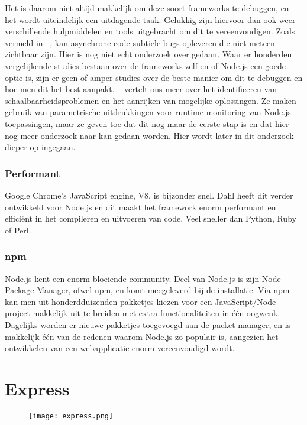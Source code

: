 Het is daarom niet altijd makkelijk om deze soort frameworks te debuggen, en het wordt uiteindelijk een uitdagende taak. Gelukkig zijn hiervoor dan ook weer verschillende hulpmiddelen en tools uitgebracht om dit te vereenvoudigen. Zoals vermeld in ~\autocite{Runtime2017}, kan asynchrone code subtiele bugs opleveren die niet meteen zichtbaar zijn. Hier is nog niet echt onderzoek over gedaan. Waar er honderden vergelijkende studies bestaan over de frameworks zelf en of Node.js een goede optie is, zijn er geen of amper studies over de beste manier om dit te debuggen en hoe men dit het best aanpakt. ~\autocite{Runtime2017} vertelt ons meer over het identificeren van schaalbaarheidsproblemen en het aanrijken van mogelijke oplossingen. Ze maken gebruik van parametrische uitdrukkingen voor runtime monitoring van Node.js toepassingen, maar ze geven toe dat dit nog maar de eerste stap is en dat hier nog meer onderzoek naar kan gedaan worden. Hier wordt later in dit onderzoek dieper op ingegaan.

\subsubsection{Performant}
\label{sec:fast}

Google Chrome's JavaScript engine, V8, is bijzonder snel. Dahl heeft dit verder ontwikkeld voor Node.js en dit maakt het framework enorm performant en efficiënt in het compileren en uitvoeren van code. Veel sneller dan Python, Ruby of Perl.

\subsubsection{npm}
\label{sec:npm}

Node.js kent een enorm bloeiende community. Deel van Node.js is zijn Node Package Manager, ofwel npm, en komt meegeleverd bij de installatie. Via npm kan men uit honderdduizenden pakketjes kiezen voor een JavaScript/Node project makkelijk uit te breiden met extra functionaliteiten in één oogwenk. Dagelijks worden er nieuwe pakketjes toegevoegd aan de packet manager, en is makkelijk één van de redenen waarom Node.js zo populair is, aangezien het ontwikkelen van een webapplicatie enorm vereenvoudigd wordt.   

\section{Express}
\label{sec:express}

\begin{figure}[h]
	\centering
	\texttt{[image: express.png]}
	\label{fig:express}
\end{figure}

